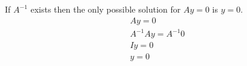 \documentclass{article}
\begin{document}
    	If $A^{-1}$ exists then the only possible solution for $Ay = 0$ is $y=0$. 
       	\begin{align*}
       	Ay=0\\
       	A^{-1}Ay=A^{-1}0\\
       	Iy=0\\
       	y=0
		\end{align*}
    
\end{document}

